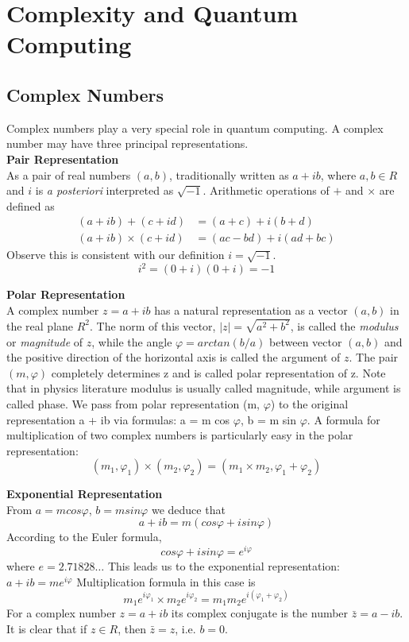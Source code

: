 \section{Complexity and Quantum Computing}
\subsection{Complex Numbers}
Complex numbers play a very special role in quantum computing.
A complex number may have three principal representations.\\

\textbf{Pair Representation}\\
As a pair of real numbers $(a, b)$, traditionally written as $a + ib$,
where $a, b \in R$ and $i$ is \textit{a posteriori} interpreted as $\sqrt{-1}$.
Arithmetic operations of $+$ and $\times$ are defined as
\begin{align*}
    (a+ib) +      (c+id) &= (a+c)   + i(b+d)  \\
    (a+ib) \times (c+id) &= (ac−bd) + i(ad+bc)
\end{align*}
Observe this is consistent with our definition $i=\sqrt{-1}$.
$$i^2 = (0 + i)(0 + i) = −1$$

\textbf{Polar Representation}\\
A complex number $z = a + ib$ has a natural representation
as a vector $(a,b)$ in the real plane $R^2$.
The norm of this vector, $|z| = \sqrt{a^2 +b^2}$,
is called the \textit{modulus} or \textit{magnitude} of $z$,
while the angle $\varphi = arctan(b/a)$ between vector $(a, b)$
and the positive direction of the horizontal axis is called the argument of $z$.
The pair $(m,\varphi)$ completely determines z and is called polar representation of z.
Note that in physics literature modulus is usually called magnitude, while argument is called phase.
We pass from polar representation (m, $\varphi$) to the original representation a + ib via formulas:
a = m cos $\varphi$, b = m sin $\varphi$.
A formula for multiplication of two complex numbers is particularly
easy in the polar representation:
$$(m_1, \varphi_1) \times (m_2, \varphi_2) = (m_1 \times m_2, \varphi_1 + \varphi_2)$$

\textbf{Exponential Representation}\\
From $a = m cos \varphi$, $b = m sin \varphi$ we deduce that
$$a + ib = m(cos\varphi + isin\varphi)$$
According to the Euler formula,
$$cos\varphi + isin\varphi = e^{i\varphi}$$
where $e = 2.71828\dots$
This leads us to the exponential representation:
$a + ib = me^{i\varphi}$
Multiplication formula in this case is
$$m_1e^{i\varphi_1} \times m_2e^{i\varphi_2} = m_1m_2e^{i(\varphi_1+\varphi_2)}$$
For a complex number $z = a + ib$ its complex conjugate is the number $\bar{z} = a − ib$.
It is clear that if $z \in R$, then $\bar{z} = z$, i.e. $b = 0$.

